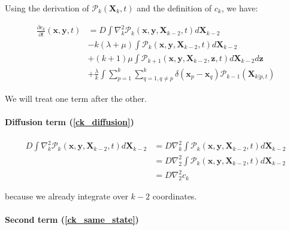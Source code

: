 Using the derivation of $\mathcal{P}_{k}(\boldsymbol{X}_{k},t)$ and
the definition of $c_{k}$, we have:

\begin{subequations} 
\begin{align}
\frac{\partial c_{k}}{\partial t}(\boldsymbol{x},\boldsymbol{y},t) & =D\int\nabla_{k}^{2}\mathcal{P}_{k}(\boldsymbol{x},\boldsymbol{y},\boldsymbol{X}_{k-2},t)d\boldsymbol{X}_{k-2}\label{ck_diffusion}\\
 & -k(\lambda+\mu)\int\mathcal{P}_{k}(\boldsymbol{x},\boldsymbol{y},\boldsymbol{X}_{k-2},t)d\boldsymbol{X}_{k-2}\label{ck_same_state}\\
 & +(k+1)\mu\int\mathcal{P}_{k+1}(\boldsymbol{x},\boldsymbol{y},\boldsymbol{X}_{k-2},\boldsymbol{z},t)d\boldsymbol{X}_{k-2}d\boldsymbol{z}\label{ck_death}\\
 & +\frac{\lambda}{k}\int\sum_{p=1}^{k}\sum_{q=1,q\neq p}^{k}\delta({\boldsymbol{x}_p-\boldsymbol{x}_q})\mathcal{P}_{k-1}(\boldsymbol{X}_{k|p,t})\label{ck_birth}
\end{align}
\end{subequations}

We will treat one term after the other. \\


\paragraph*{Diffusion term (\ref{ck_diffusion})}

\begin{subequations} 
\begin{align}
D\int\nabla_{k}^{2}\mathcal{P}_{k}(\boldsymbol{x},\boldsymbol{y},\boldsymbol{X}_{k-2},t)d\boldsymbol{X}_{k-2} & =D\nabla_{k}^{2}\int\mathcal{P}_{k}(\boldsymbol{x},\boldsymbol{y},\boldsymbol{X}_{k-2},t)d\boldsymbol{X}_{k-2}\\
 & =D\nabla_{2}^{2}\int\mathcal{P}_{k}(\boldsymbol{x},\boldsymbol{y},\boldsymbol{X}_{k-2},t)d\boldsymbol{X}_{k-2}\\
 & =D\nabla_{2}^{2}c_{k}\label{diffusion_term_deriv}
\end{align}
\end{subequations}

because we already integrate over $k-2$ coordinates.

\paragraph*{Second term (\ref{ck_same_state})}


